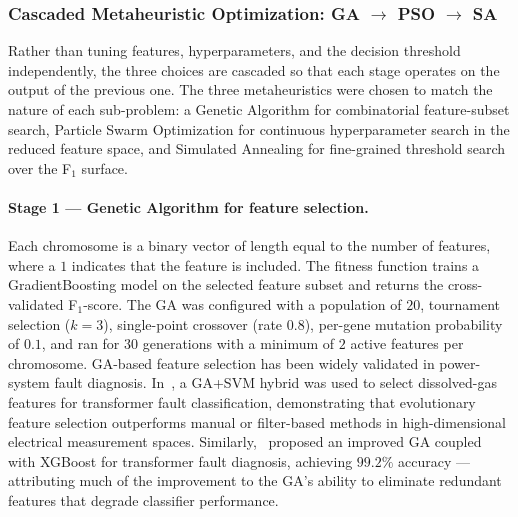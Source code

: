 \documentclass[11pt]{article}
\begin{document}
\subsubsection*{Cascaded Metaheuristic Optimization: GA $\rightarrow$ PSO $\rightarrow$ SA}
Rather than tuning features, hyperparameters, and the decision threshold independently, the three choices are cascaded so that each stage operates on the output of the previous one. The three metaheuristics were chosen to match the nature of each sub-problem: a Genetic Algorithm for combinatorial feature-subset search, Particle Swarm Optimization for continuous hyperparameter search in the reduced feature space, and Simulated Annealing for fine-grained threshold search over the F$_1$ surface.

\paragraph{Stage 1 --- Genetic Algorithm for feature selection.}
Each chromosome is a binary vector of length equal to the number of features, where a $1$ indicates that the feature is included. The fitness function trains a GradientBoosting model on the selected feature subset and returns the cross-validated F$_1$-score. The GA was configured with a population of $20$, tournament selection ($k=3$), single-point crossover (rate $0.8$), per-gene mutation probability of $0.1$, and ran for $30$ generations with a minimum of $2$ active features per chromosome. GA-based feature selection has been widely validated in power-system fault diagnosis. In~\cite{iet-gtd2018}, a GA+SVM hybrid was used to select dissolved-gas features for transformer fault classification, demonstrating that evolutionary feature selection outperforms manual or filter-based methods in high-dimensional electrical measurement spaces. Similarly,~\cite{frontiers2021igaxgboost} proposed an improved GA coupled with XGBoost for transformer fault diagnosis, achieving $99.2\%$ accuracy --- attributing much of the improvement to the GA's ability to eliminate redundant features that degrade classifier performance.
\end{document}
